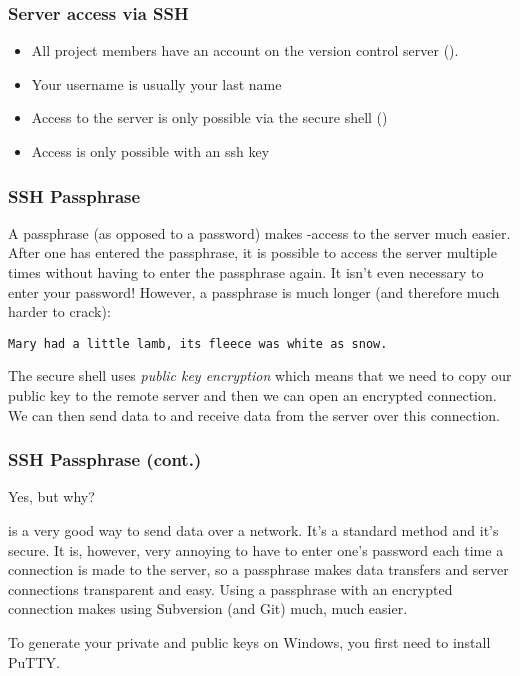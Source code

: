\begin{frame}[fragile]
\frametitle{Server access via SSH}
\begin{itemize}
\item All project members have an account on the version control
    server ().
\item Your username is usually your last name
\item Access to the server is only possible via the secure shell ()
\item Access is only possible with an ssh key
\end{itemize}
\end{frame}

\begin{frame}[fragile]
\frametitle{SSH Passphrase}

A passphrase (as opposed to a password) makes -access to the
server much easier.  After one has entered the passphrase, it is possible to
access the server multiple times without having to enter the passphrase
again.  It isn't even necessary to enter your password!  However, a
passphrase is much longer (and therefore much harder to crack):
\begin{lstlisting}
Mary had a little lamb, its fleece was white as snow.
\end{lstlisting}

The secure shell uses \emph{public key encryption} which means that we need
to copy our public key to the remote server and then we can open an
encrypted connection.  We can then send data to and receive data from the
server over this connection.
\end{frame}

\begin{frame}[fragile]
\frametitle{SSH Passphrase (cont.)}

Yes, but why?

 is a very good way to send data over a network.  It's a standard
method and it's secure.  It is, however, very annoying to have to enter
one's password each time a connection is made to the server, so a passphrase
makes data transfers and server connections transparent and easy.  Using a
passphrase with an encrypted connection makes using Subversion (and Git)
much, much easier.

To generate your private and public keys on Windows, you first need to
install PuTTY.
\end{frame}

